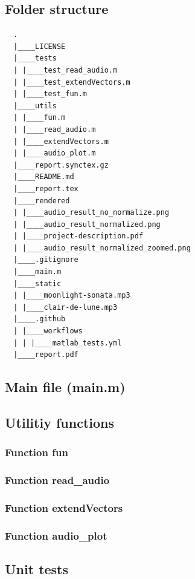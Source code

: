 \documentclass[a4paper,12pt]{article}
\begin{document}
\subsection*{Folder structure}
\begin{verbatim}
  .
  |____LICENSE
  |____tests
  | |____test_read_audio.m
  | |____test_extendVectors.m
  | |____test_fun.m
  |____utils
  | |____fun.m
  | |____read_audio.m
  | |____extendVectors.m
  | |____audio_plot.m
  |____report.synctex.gz
  |____README.md
  |____report.tex
  |____rendered
  | |____audio_result_no_normalize.png
  | |____audio_result_normalized.png
  | |____project-description.pdf
  | |____audio_result_normalized_zoomed.png
  |____.gitignore
  |____main.m
  |____static
  | |____moonlight-sonata.mp3
  | |____clair-de-lune.mp3
  |____.github
  | |____workflows
  | | |____matlab_tests.yml
  |____report.pdf
\end{verbatim}

\subsection*{Main file (main.m)}


\pagebreak
\subsection*{Utilitiy functions}

\subsubsection*{Function fun}

\subsubsection*{Function read\_audio}

\subsubsection*{Function extendVectors}

\subsubsection*{Function audio\_plot}


\pagebreak
\subsection*{Unit tests}
\end{document}
